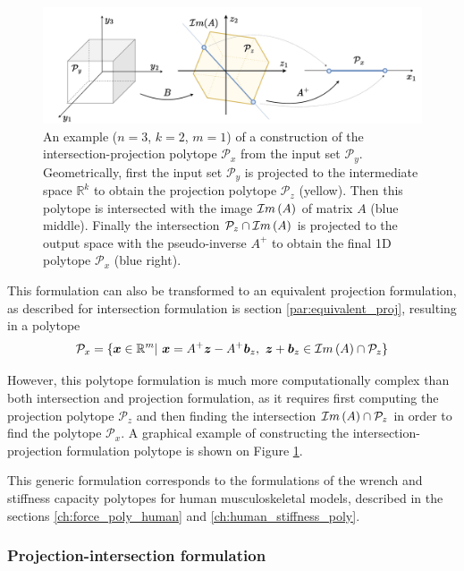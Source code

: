 \begin{figure}[!t]
    \centering
    \includegraphics[width=\linewidth]{Chapters/imgs/spec_int_proj.pdf}
    \caption{An example ($n=3$, $k=2$, $m=1$) of a construction of the intersection-projection polytope $\mathcal{P}_x$ from the input set $\mathcal{P}_y$. Geometrically, first the input set $\mathcal{P}_y$ is projected to the intermediate space $\mathbb{R}^k$ to obtain the projection polytope $\mathcal{P}_z$ (yellow). Then this polytope is intersected with the image $\mathcal{I}m\left(A\right)$ of matrix $A$ (blue middle). Finally the intersection $\mathcal{P}_z\cap\mathcal{I}m\left(A\right)$ is projected to the output space with the pseudo-inverse $A^+$ to obtain the final 1D polytope $\mathcal{P}_x$ (blue right).}
    \label{fig:inter_proj_spec}
\end{figure}
This formulation can also be transformed to an equivalent projection formulation, as described for intersection formulation is section \ref{par:equivalent_proj}, resulting in a polytope 
\begin{equation}
\mathcal{P}_x=\{\bm{x} \in \mathbb{R}^m |~ \bm{x} = A^+\bm{z} - A^+\bm{b}_z,~ \bm{z}+\bm{b}_z \in \mathcal{I}m\left(A\right)\cap\mathcal{P}_z\} 
\end{equation}

However, this polytope formulation is much more computationally complex than both intersection and projection formulation, as it requires first computing the projection polytope $\mathcal{P}_z$ and then finding the intersection $\mathcal{I}m\left(A\right)\cap\mathcal{P}_z$ in order to find the polytope $\mathcal{P}_x$. A graphical example of constructing the intersection-projection formulation polytope is shown on Figure \ref{fig:inter_proj_spec}.


\begin{remark}
    This generic formulation corresponds to the formulations of the wrench and stiffness capacity polytopes for human musculoskeletal models, described in the sections \ref{ch:force_poly_human} and \ref{ch:human_stiffness_poly}.
\end{remark}


\subsubsection{Projection-intersection formulation}

